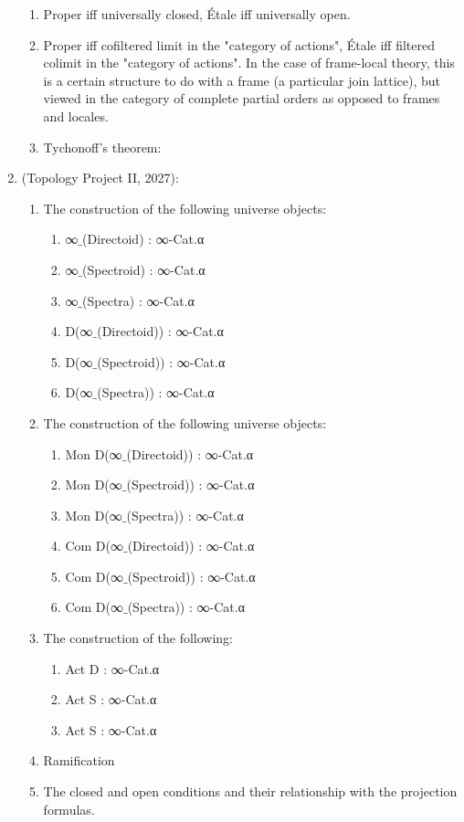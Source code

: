 \documentclass{book}
\begin{document}
\begin{enumerate}
\begin{enumerate}
\item Proper iff universally closed, Étale iff universally open.
\item Proper iff cofiltered limit in the "category of actions", Étale iff filtered colimit in the "category of actions". In the case of frame-local theory, this is a certain structure to do with a frame (a particular join lattice), but viewed in the category of complete partial orders as opposed to frames and locales.
\item Tychonoff's theorem: 
\end{enumerate}
\item (Topology Project II, 2027):
\begin{enumerate}
\item The construction of the following universe objects:
\begin{enumerate}
\item ∞${}\_$(Directoid) : ∞-Cat.α
\item ∞${}\_$(Spectroid) : ∞-Cat.α
\item ∞${}\_$(Spectra) : ∞-Cat.α
\item D(∞${}\_$(Directoid)) : ∞-Cat.α
\item D(∞${}\_$(Spectroid)) : ∞-Cat.α
\item D(∞${}\_$(Spectra)) : ∞-Cat.α
\end{enumerate}
\item The construction of the following universe objects:
\begin{enumerate}
\item Mon D(∞${}\_$(Directoid)) : ∞-Cat.α
\item Mon D(∞${}\_$(Spectroid)) : ∞-Cat.α
\item Mon D(∞${}\_$(Spectra)) : ∞-Cat.α
\item Com D(∞${}\_$(Directoid)) : ∞-Cat.α
\item Com D(∞${}\_$(Spectroid)) : ∞-Cat.α
\item Com D(∞${}\_$(Spectra)) : ∞-Cat.α
\end{enumerate}
\item The construction of the following:
\begin{enumerate}
\item Act D : ∞-Cat.α 
\item Act S : ∞-Cat.α
\item Act S : ∞-Cat.α
\end{enumerate}
\item Ramification 
\item The closed and open conditions and their relationship with the projection formulas.

\end{enumerate}
\end{enumerate}
\end{document}

